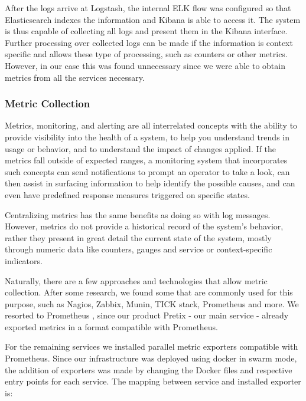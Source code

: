 \documentclass[12pt]{article}
\begin{document}
After the logs arrive at Logstash, the internal ELK flow was configured so that Elasticsearch indexes the information and Kibana is able to access it. 
The system is thus capable of collecting all logs and present them in the Kibana interface.
Further processing over collected logs can be made if the information is context specific and allows these type of processing, such as counters or other metrics. 
However, in our case this was found unnecessary since we were able to obtain metrics from all the services necessary.

\subsubsection{Metric Collection}

Metrics, monitoring, and alerting are all interrelated concepts with the ability to provide visibility into the health of a system, to help you understand trends 
in usage or behavior, and to understand the impact of changes applied. 
If the metrics fall outside of expected ranges, a monitoring system that incorporates such concepts can send notifications to prompt an operator to take a look, 
can then assist in surfacing information to help identify the possible causes, and can even have predefined response measures triggered on specific states.

Centralizing metrics has the same benefits as doing so with log messages.
However, metrics do not provide a historical record of the system's behavior, rather they present in great detail the current state of the system, mostly through 
numeric data like counters, gauges and service or context-specific indicators.

Naturally, there are a few approaches and technologies that allow metric collection. 
After some research, we found some that are commonly used for this purpose, such as Nagios, Zabbix, Munin, TICK stack, Prometheus and more. 
We resorted to Prometheus \cite{prometheus}, since our product Pretix - our main service - already exported metrics in a format compatible with Prometheus.

For the remaining services we installed parallel metric exporters compatible with Prometheus. 
Since our infrastructure was deployed using docker in swarm mode, the addition of exporters was made by changing the Docker files and respective entry points 
for each service. 
The mapping between service and installed exporter is:
\end{document}
